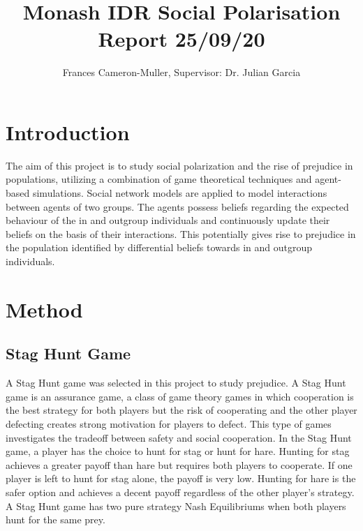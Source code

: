 \documentclass[]{llncs}
\begin{document}
\title{Monash IDR Social Polarisation Report 25/09/20}

\author{Frances Cameron-Muller, Supervisor: Dr. Julian Garcia}


\maketitle    

 \section{Introduction}
  The aim of this project is to study social polarization and the rise of prejudice in populations, utilizing a combination of game theoretical techniques and agent-based simulations. Social network models are applied to model interactions between agents of two groups. The agents possess beliefs regarding the expected behaviour of the in and outgroup individuals and continuously update their beliefs on the basis of their interactions. This potentially gives rise to prejudice in the population identified by differential beliefs towards in and outgroup individuals. 

 \section{Method}
 
 \subsection{Stag Hunt Game}
 A Stag Hunt game was selected in this project to study prejudice. A Stag Hunt game is an assurance game, a class of game theory games in which cooperation is the best strategy for both players but the risk of cooperating and the other player defecting creates strong motivation for players to defect. This type of games investigates the tradeoff between safety and social cooperation. In the Stag Hunt game, a player has the choice to hunt for stag or hunt for hare. Hunting for stag achieves a greater payoff than hare but requires both players to cooperate. If one player is left to hunt for stag alone, the payoff is very low. Hunting for hare is the safer option and achieves a decent payoff regardless of the other player’s strategy. A Stag Hunt game has two pure strategy Nash Equilibriums when both players hunt for the same prey. 
 
\end{document}
